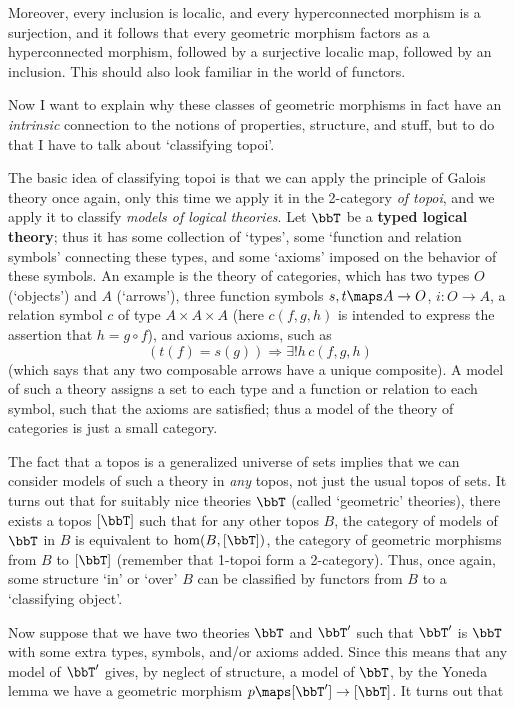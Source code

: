 \documentclass{amsart}
\begin{document}
Moreover, every inclusion is localic, and every hyperconnected
morphism is a surjection, and it follows that every geometric morphism
factors as a hyperconnected morphism, followed by a surjective localic
map, followed by an inclusion.  This should also look familiar in the
world of functors.

Now I want to explain why these classes of geometric morphisms in fact
have an \emph{intrinsic} connection to the notions of properties,
structure, and stuff, but to do that I have to talk about
`classifying topoi'.

The basic idea of classifying topoi is that we can apply the principle
of Galois theory once again, only this time we apply it in the
2-category \emph{of topoi}, and we apply it to classify \emph{models
of logical theories}.  Let $\bbT$ be a \textbf{typed logical
theory}; thus it has some collection of `types', some `function and
relation symbols' connecting these types, and some `axioms' imposed on
the behavior of these symbols.  An example is the theory of
categories, which has two types $O$ (`objects') and $A$ (`arrows'),
three function symbols $s,t\maps A\to O$, $i:O\to A$, a relation
symbol $c$ of type $A\times A \times A$ (here $c(f,g,h)$ is intended
to express the assertion that $h=g\circ f$), and various axioms, such
as
\[(t(f) = s(g)) \Rightarrow \exists! h \, c(f,g,h)\] 
(which says that any
two composable arrows have a unique composite).  A model of such a
theory assigns a set to each type and a function or relation to each
symbol, such that the axioms are satisfied; thus a model of the theory
of categories is just a small category.

The fact that a topos is a generalized universe of sets implies that
we can consider models of such a theory in \emph{any} topos, not just
the usual topos of sets.  It turns out that for suitably nice theories
$\bbT$ (called `geometric' theories), there exists a topos $[\bbT]$
such that for any other topos $B$, the category of models of $\bbT$ in
$B$ is equivalent to $\hom(B,[\bbT])$, the category of geometric
morphisms from $B$ to $[\bbT]$ (remember that 1-topoi form a 2-category).
Thus, once again, some structure `in' or `over' $B$ can be classified
by functors from $B$ to a `classifying object'.

Now suppose that we have two theories $\bbT$ and $\bbT'$ such that
$\bbT'$ is $\bbT$ with some extra types, symbols, and/or axioms added.
Since this means that any model of $\bbT'$ gives, by neglect of
structure, a model of $\bbT$, by the Yoneda lemma we have a geometric
morphism $p\maps [\bbT']\to{} [\bbT]$.  It turns out that
\end{document}
